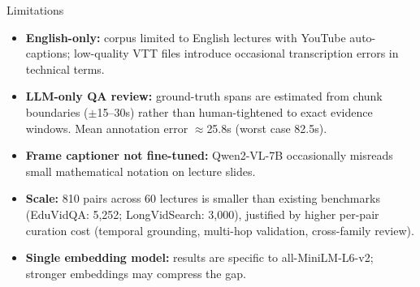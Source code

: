 \documentclass[aspectratio=169,t]{beamer}
\begin{document}
\begin{frame}{Limitations}

\begin{itemize}
  \setlength{\itemsep}{8pt}
  \item \textbf{English-only:} corpus limited to English lectures with YouTube
        auto-captions; low-quality VTT files introduce occasional transcription
        errors in technical terms.

  \item \textbf{LLM-only QA review:} ground-truth spans are estimated from chunk
        boundaries ($\pm$15--30s) rather than human-tightened to exact evidence windows.
        Mean annotation error $\approx$25.8s (worst case 82.5s).

  \item \textbf{Frame captioner not fine-tuned:} Qwen2-VL-7B occasionally misreads
        small mathematical notation on lecture slides.

  \item \textbf{Scale:} 810 pairs across 60 lectures is smaller than existing benchmarks
        (EduVidQA: 5,252; LongVidSearch: 3,000), justified by higher per-pair curation
        cost (temporal grounding, multi-hop validation, cross-family review).

  \item \textbf{Single embedding model:} results are specific to all-MiniLM-L6-v2;
        stronger embeddings may compress the gap.
\end{itemize}

\end{frame}
\end{document}
